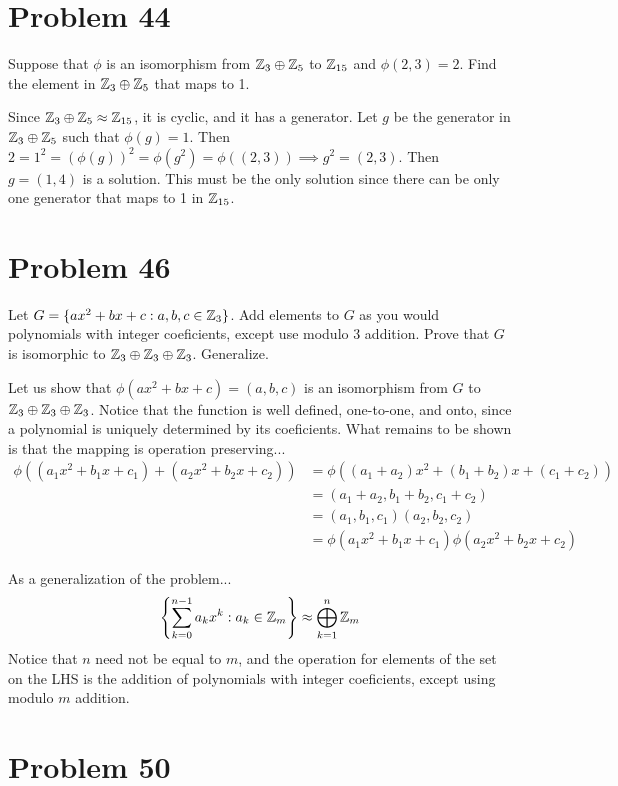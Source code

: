 \documentclass{article}
\begin{document}
\section*{Problem 44}

Suppose that $\phi$ is an isomorphism from $\mathbb{Z}_3\oplus\mathbb{Z}_5$ to $\mathbb{Z}_{15}$ and
$\phi(2,3)=2$.  Find the element in $\mathbb{Z}_3\oplus\mathbb{Z}_5$ that maps to 1.

Since $\mathbb{Z}_3\oplus\mathbb{Z}_5\approx\mathbb{Z}_{15}$, it is cyclic, and it has a generator.
Let $g$ be the generator in $\mathbb{Z}_3\oplus\mathbb{Z}_5$ such that $\phi(g)=1$.
Then $2=1^2=(\phi(g))^2 = \phi(g^2) = \phi((2,3))\implies g^2=(2,3)$.
Then $g=(1,4)$ is a solution.  This must be the only solution since
there can be only one generator that maps to 1 in $\mathbb{Z}_{15}$.

\section*{Problem 46}

Let $G=\{ax^2+bx+c:a,b,c\in\mathbb{Z}_3\}$.  Add elements to $G$ as you would
polynomials with integer coeficients, except use modulo 3 addition.
Prove that $G$ is isomorphic to $\mathbb{Z}_3\oplus\mathbb{Z}_3\oplus\mathbb{Z}_3$.  Generalize.

Let us show that $\phi(ax^2+bx+c)=(a,b,c)$ is an isomorphism from
$G$ to $\mathbb{Z}_3\oplus\mathbb{Z}_3\oplus\mathbb{Z}_3$.  Notice that the function is well
defined, one-to-one, and onto, since a polynomial is uniquely
determined by its coeficients.  What remains to be shown is that the
mapping is operation preserving...
\begin{align*}
\phi((a_1x^2+b_1x+c_1)+(a_2x^2+b_2x+c_2))
 &= \phi((a_1+a_2)x^2+(b_1+b_2)x+(c_1+c_2)) \\
 &= (a_1+a_2,b_1+b_2,c_1+c_2) \\
 &= (a_1,b_1,c_1)(a_2,b_2,c_2) \\
 &= \phi(a_1x^2+b_1x+c_1)\phi(a_2x^2+b_2x+c_2)
\end{align*}

As a generalization of the problem...
\begin{equation*}
\left\{\sum_{k=0}^{n-1}a_kx^k:a_k\in\mathbb{Z}_m\right\}\approx\bigoplus_{k=1}^n\mathbb{Z}_m
\end{equation*}
Notice that $n$ need not be equal to $m$, and the operation for elements of the
set on the LHS is the addition of polynomials with integer coeficients, except using
modulo $m$ addition.

\section*{Problem 50}
\end{document}
